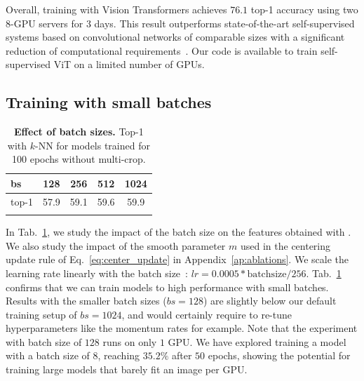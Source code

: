 Overall, training \OURS with Vision Transformers achieves $76.1$ top-1 accuracy using two 8-GPU servers for 3 days.
This result outperforms state-of-the-art self-supervised systems based on convolutional networks of comparable sizes with a significant reduction of computational requirements~\cite{grill2020bootstrap,caron2020unsupervised}.
Our code is available to train self-supervised ViT on a limited number of GPUs.

\subsection{Training with small batches}
\label{sec:smallbs}
\begin{table}[h]
  \centering
\begin{minipage}{.5\linewidth}
\small
  \setlength{\tabcolsep}{4pt}
  \begin{tabular}{@{}l c c c c@{}}
    \toprule
	  bs & 128 & 256 & 512 & 1024 \\
    \midrule
	  top-1 & 57.9 & 59.1 & 59.6 & 59.9  \\
    \bottomrule
\phantom{latex!}
  \end{tabular}
\end{minipage}
\hspace{1em}
\begin{minipage}{.4\linewidth}
  \caption{
	  \textbf{Effect of batch sizes.} Top-1 with $k$-NN for models trained for 100 epochs without multi-crop.
  }
  \label{tab:bs}
\end{minipage}
\vspace{-1em}
\end{table}
In Tab.~\ref{tab:bs}, we study the impact of the batch size on the features obtained with \OURS.
We also study the impact of the smooth parameter $m$ used in the centering update rule of Eq.~\ref{eq:center_update} in Appendix~\ref{ap:ablations}.
We scale the learning rate linearly with the batch size~\cite{goyal2017accurate}: $lr = 0.0005 * \text{batchsize} / 256 $.
Tab.~\ref{tab:bs} confirms that we can train models to high performance with small batches.
Results with the smaller batch sizes ($bs=128$) are slightly below our default training setup of $bs=1024$, and would certainly require to re-tune hyperparameters like the momentum rates for example.
Note that the experiment with batch size of $128$ runs on only $1$ GPU.
We have explored training a model with a batch size of $8$, reaching $35.2\%$ after $50$ epochs, showing the potential for training large models that barely fit an image per GPU.
